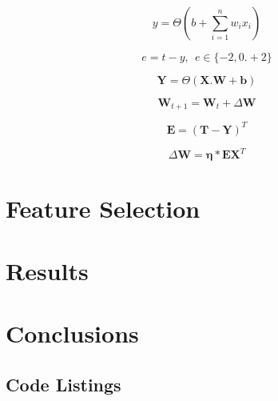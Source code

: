 \documentclass{ecsarticle}     %
\begin{document}
\begin{equation}
   y = \Theta \left(b + \sum_{i=1}^{n} w_i x_i \right)
   \label{eqn:slp}
\end{equation}

\begin{equation}	
	e = t - y,\:\:e \in \{-2,0.+2\}
	\label{eqn:slp_error}
\end{equation}

\begin{equation}
   \textbf{Y} = \Theta ( \textbf{X}.\textbf{W} + \textbf{b})
   \label{eqn:slp_mat}
\end{equation}

\begin{equation}	
	\textbf{W}_{t+1} = \textbf{W}_t + \Delta \textbf{W}
	\label{eqn:slp_learn_1}
\end{equation}

\begin{equation}	
	\mathbf{E} = (\mathbf{T} - \mathbf{Y})^{T}
	\label{eqn:slp_learn_2}
\end{equation}

\begin{equation}	
	\Delta \mathbf{W} = \mathbf{\eta}*\mathbf{E}\mathbf{X}^T
	\label{eqn:slp_learn_3}
\end{equation}



\section{Feature Selection}

\section{Results}

\section{Conclusions}


\newpage






\backmatter
\begin{appendix}

\newpage
\section{Code Listings}

\end{appendix}

\end{document}
